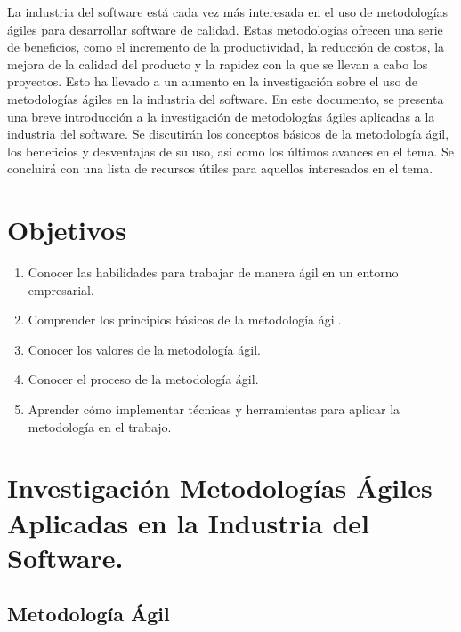 \documentclass[12pt]{article}
\begin{document}
\vspace{1cm}
\begin{center}
  \begin{minipage}{14cm}
  La industria del software está cada vez más interesada en el uso de metodologías ágiles
  para desarrollar software de calidad. Estas metodologías ofrecen una serie de
  beneficios, como el incremento de la productividad, la reducción de costos, la mejora de la
  calidad del producto y la rapidez con la que se llevan a cabo los proyectos. Esto ha
  llevado a un aumento en la investigación sobre el uso de metodologías ágiles en la
  industria del software. En este documento, se presenta una breve introducción a la 
  investigación de metodologías ágiles aplicadas a la industria del software. Se discutirán
  los conceptos básicos de la metodología ágil, los beneficios y desventajas de su uso, así
  como los últimos avances en el tema. Se concluirá con una lista de recursos útiles para 
  aquellos interesados en el tema.
  \end{minipage}
\end{center}


\newpage

\section{ Objetivos }

\begin{enumerate}
  \item Conocer las habilidades para trabajar de manera ágil en un entorno empresarial.
  \item Comprender los principios básicos de la metodología ágil.
  \item Conocer los valores de la metodología ágil.
  \item Conocer el proceso de la metodología ágil.
  \item Aprender cómo implementar técnicas y herramientas para aplicar la metodología en el trabajo.
\end{enumerate}

\vspace{1cm}

\section{Investigación Metodologías Ágiles Aplicadas en la Industria del Software.}

\vspace{1cm}
\subsection{ Metodología Ágil }
\end{document}

